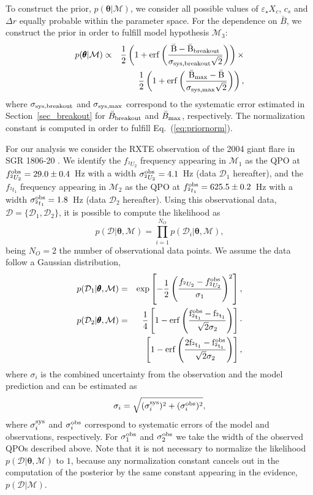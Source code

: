 \documentclass[useAMS,usenatbib]{mnras}
\newcommand{\D}[0]{{\mathcal D}}
\newcommand{\M}[0]{{\mathcal M}}
\begin{document}
To construct the prior, $p ({\pmb \theta|\M})$, we consider all possible values 
of $\varepsilon_\star X_c$, $c_s$ and $\Delta r$ equally probable within the 
parameter space.  For the dependence on $\bar B$, we construct the prior in 
order to fulfill model hypothesis $\M_3$:
%
\begin{eqnarray}
p ({\pmb \theta|\M}) &\propto& \frac{1}{2} \left(1 + \rm{erf} \left(\frac{\bar B - 
\bar B_{\rm breakout}}{ \sigma_{\rm sys, breakout} \sqrt{2}}\right)\right) 
\times \nonumber \\
&&  \frac{1}{2} \left(1 + \rm{erf} \left(\frac{\bar B_{\rm max} - \bar B}{\sigma_{\rm sys, max} \sqrt{2} }\right)\right) , 
\end{eqnarray}
%
where $\sigma_{\rm sys, breakout}$ and $\sigma_{\rm sys, max}$ correspond to 
the systematic error estimated in 
Section~\ref{sec_breakout} for $\bar B_{\rm breakout}$ and $\bar B_{\rm max}$, 
respectively. The normalization
constant is computed in order to fulfill  Eq.~(\ref{eq:priornorm}).

For our analysis we consider the RXTE observation of the 2004 giant flare in SGR 1806-20 \citep{Strohmayer2006}. 
We identify the $f_{^2U_2}$ frequency appearing in $\M_1$ as the QPO at $f^{\rm obs}_{^2U_2}=29.0\pm0.4$~Hz with a width 
$\sigma^{\rm obs}_{^2U_2}=4.1$~Hz
(data $\D_1$ hereafter), and the $f_{^2t_1}$ frequency appearing in $\M_2$ as the QPO at $f^{\rm obs}_{^2t_1}=625.5\pm0.2$~Hz with a width 
 $\sigma^{\rm obs}_{^2t_1}=1.8$~Hz 
(data $\D_2$ hereafter).  Using this observational data, $\D = \{ \D_1, \D_2\}$, it is possible to compute the likelihood as 
%
\begin{equation}
p (\D|{\pmb \theta},\M) = \prod_{i=1}^{N_O}p (\D_i|{\pmb \theta},\M),
\end{equation}
% 
being $N_O=2$ the number of observational data points. We assume the data follow a Gaussian distribution,
%
\begin{eqnarray}
p (\D_1|{\pmb \theta},\M) &=& %
\exp \left[  -\frac{1}{2} \left(\frac{f_{^2U_2} - f^{\rm obs}_{^2U_2}}{\sigma_1}\right)^2 \right],\\
p (\D_2|{\pmb \theta},\M) &=& \frac{1}{4} \left[ 1 - \rm{erf} \left(\frac{f^{\rm 
obs}_{^2t_1} - f_{^2t_1}}{\sqrt{2} \sigma_2}\right) \right] \cdot \nonumber \\
&& \left[ 1 - \rm{erf} \left(\frac{2 f_{^2t_1} - f^{\rm obs}_{^2t_1} }{\sqrt{2} \sigma_2}\right) \right],
\end{eqnarray}
%
where $\sigma_i$ is the combined uncertainty from the observation and the model prediction and can be estimated as 
\begin{equation}
\sigma_i = \sqrt{(\sigma^{\rm sys}_i)^2 + (\sigma^{\rm obs}_i)^2},
\end{equation}
where $\sigma^{\rm sys}_i$ and $\sigma^{\rm obs}_i$ correspond to systematic errors of the model and observations, respectively. For $\sigma^{\rm obs}_1$ and $\sigma^{\rm obs}_2$ we take the width of the observed QPOs described above.
Note that it is not necessary to normalize the likelihood $p (\D|{\pmb \theta},\M)$ to $1$, because any normalization constant cancels out in the computation of the posterior by the same constant appearing in the evidence, $p(\D|\M)$.
\end{document}
